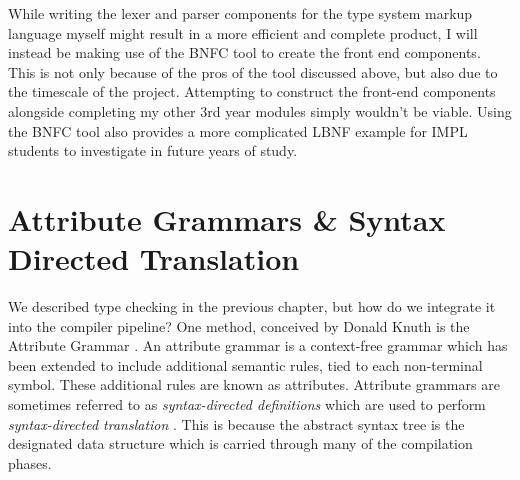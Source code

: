 \documentclass{UoYCSproject}
\begin{document}
While writing the lexer and parser components for the type system markup language
myself might result in a more efficient and complete product, I will instead be
making use of the BNFC tool to create the front end components. This is not only
because of the pros of the tool discussed above, but also due to the timescale
of the project. Attempting to construct the front-end components alongside
completing my other 3rd year modules simply wouldn't be viable. Using the BNFC
tool also provides a more complicated LBNF example for IMPL students to
investigate in future years of study.

\section{Attribute Grammars \& Syntax Directed Translation}
We described type checking in the previous chapter, but how do we
integrate it into the compiler pipeline? One method, conceived by Donald Knuth
is the Attribute Grammar \cite{KnuthGrammars}. An attribute grammar is a
context-free grammar which has been extended to include additional semantic
rules, tied to each non-terminal symbol. These additional rules are known as
attributes. Attribute grammars are sometimes referred to as 
\textit{syntax-directed definitions} which are used to perform 
\textit{syntax-directed translation} \cite{DragonBook}. This is because the 
abstract syntax tree is the designated data structure which is carried
through many of the compilation phases.
\end{document}
